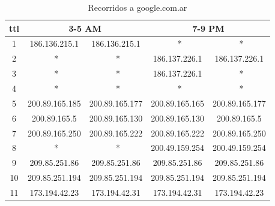 \documentclass[a4paper]{article}
\begin{document}
\begin{table}[!htb]
 	\begin{center}
 	\begin{tabular}{|c|c|c|c|c|}
 	  \hline
 	  ttl & \multicolumn{2}{|c|}{3-5 AM} & \multicolumn{2}{|c|}{7-9 PM} \\ \hline
	  1 & 186.136.215.1 & 186.136.215.1 &  \ *  &  \ * \\ \hline
	  2 &  \ *  &  \ *  & 186.137.226.1 & 186.137.226.1\\ \hline
	  3 &  \ *  &  \ *  & 186.137.226.1 &  \ * \\ \hline
	  4 &  \ *  &  \ *  &  \ *  &  \ * \\ \hline
	  5 & 200.89.165.185 & 200.89.165.177 & 200.89.165.165 & 200.89.165.177\\ \hline
	  6 & 200.89.165.5 & 200.89.165.130 & 200.89.165.130 & 200.89.165.5\\ \hline
	  7 & 200.89.165.250 & 200.89.165.222 & 200.89.165.222 & 200.89.165.250\\ \hline
	  8 &  \ *  &  \ *  & 200.49.159.254 & 200.49.159.254\\ \hline
	  9 & 209.85.251.86 & 209.85.251.86 & 209.85.251.86 & 209.85.251.86\\ \hline
	  10 & 209.85.251.194 & 209.85.251.194 & 209.85.251.194 & 209.85.251.194\\ \hline
	  11 & 173.194.42.23 & 173.194.42.31 & 173.194.42.31 & 173.194.42.23\\ \hline
 	 \end{tabular}   
 	 \vspace{0pt}
 	 \caption{Recorridos a google.com.ar}
 	\end{center}
 	\label{tab:gootle.com.ar}
 \end{table}
\end{document}
